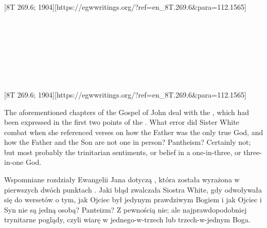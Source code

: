  \\
 \\
 \\
 \\
 \\
 \\
 \\
[8T 269.6; 1904][https://egwwritings.org/?ref=en\_8T.269.6&para=112.1565]


 \\
 \\
 \\
 \\
 \\
 \\
 \\
[8T 269.6; 1904][https://egwwritings.org/?ref=en\_8T.269.6&para=112.1565]


The aforementioned chapters of the Gospel of John deal with the , which had been expressed in the first two points of the . What error did Sister White combat when she referenced verses on how the Father was the only true God, and how the Father and the Son are not one in person? Pantheism? Certainly not; but most probably the trinitarian sentiments, or belief in a one-in-three, or three-in-one God.


Wspomniane rozdziały Ewangelii Jana dotyczą , która została wyrażona w pierwszych dwóch punktach . Jaki błąd zwalczała Siostra White, gdy odwoływała się do wersetów o tym, jak Ojciec był jedynym prawdziwym Bogiem i jak Ojciec i Syn nie są jedną osobą? Panteizm? Z pewnością nie; ale najprawdopodobniej trynitarne poglądy, czyli wiarę w jednego-w-trzech lub trzech-w-jednym Boga.


